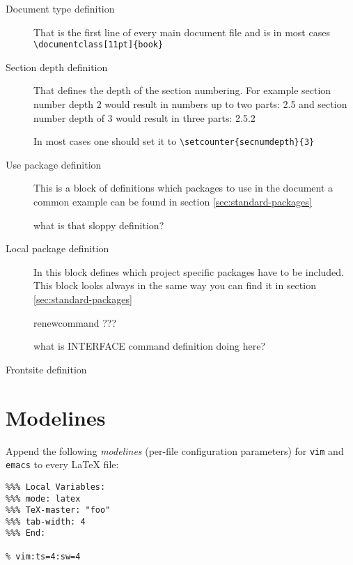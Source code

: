 \begin{description}
    \item[Document type definition] That is the first line of every
        main document file and is in most cases 
        \verb|\documentclass[11pt]{book}|

    \item[Section depth definition] That defines the depth of the
        section numbering. For example section number depth 2
        would result in numbers up to two parts: 2.5 and section
        number depth of 3 would result in three parts: 2.5.2

        In most cases one should set it to
        \verb|\setcounter{secnumdepth}{3}|

    \item[Use package definition] This is a block of definitions
        which packages to use in the document a common example
        can be found in section \ref{sec:standard-packages}

\begin{question}{what is that sloppy definition?}\end{question}

    \item[Local package definition] In this block defines which
        \SYNEIGHT project specific packages have to be included.
        This block looks always in the same way you can find it
        in section \ref{sec:standard-packages}

\begin{question}{renewcommand ???}\end{question}

\begin{question}{what is INTERFACE command definition doing here?}\end{question}

    \item[Frontsite definition] 

\end{description}


\section{Modelines}
\label{sec:latex-modelines}

Append the following \emph{modelines} (per-file configuration parameters) for
{\tt vim} and {\tt emacs} to every \LaTeX{} file:

\begin{verbatim}
%%% Local Variables:
%%% mode: latex
%%% TeX-master: "foo"
%%% tab-width: 4
%%% End:

% vim:ts=4:sw=4
\end{verbatim}

